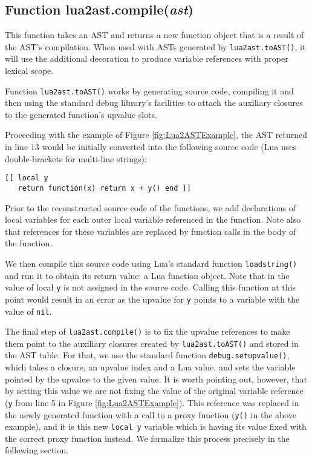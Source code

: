 \documentclass[english]{llncs}
\begin{document}
\subsection{Function lua2ast.compile(\emph{ast})}

This function takes an AST and returns a new function object that is a result of the AST's compilation.
When used with ASTs generated by \texttt{lua2ast.toAST()}, it will use the additional
decoration to produce variable references with proper lexical scope.

Function \texttt{lua2ast.toAST()} works by generating source code,
compiling it and then using the standard debug library's
facilities to attach the auxiliary closures to the generated function's
upvalue slots.

Proceeding with the example of Figure \ref{fig:Lua2ASTExample},
the AST returned in line 13 would be initially converted into the
following source code (Lua uses double-brackets for multi-line strings):

\begin{verbatim}
[[ local y
   return function(x) return x + y() end ]]
\end{verbatim}

Prior to the reconstructed source code of the functions,
we add declarations of local variables for each outer local variable
referenced in the function. Note also that references for these
variables are replaced by function calls in the body of the function.

We then compile this source code using Lua's standard function
\texttt{loadstring()} and run it to obtain its return value: a Lua function object.
Note that in the value of local \texttt{y} is not assigned
in the source code. Calling this function at this point would result
in an error as the upvalue for \texttt{y} points to a variable with
the value of \texttt{nil}.

The final step of \texttt{lua2ast.compile()} is to fix the upvalue
references to make them point to the auxiliary closures created by
\texttt{lua2ast.toAST()} and stored in the AST table.
For that, we use the standard function \texttt{debug.setupvalue()},
which takes a closure, an upvalue index and a Lua value, and sets
the variable pointed by the upvalue to the given value.
It is worth pointing out, however, that by setting this value we are not fixing the value
of the original variable reference (\texttt{y} from line 5 in Figure \ref{fig:Lua2ASTExample}).
This reference was replaced in the newly generated function
with a call to a proxy function (\texttt{y()} in the above example),
and it is this new \texttt{local y} variable which is having its value fixed
with the correct proxy function instead.
We formalize this process precisely in the following section.
\end{document}
